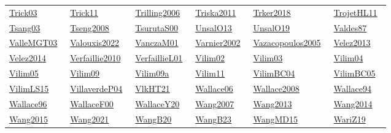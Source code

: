 \begin{longtable}{*{6}{l}}
\href{../works/Trick03.pdf}{Trick03}~\cite{Trick03} & \href{../}{Trick11}~\cite{Trick11} & \href{../}{Trilling2006}~\cite{Trilling2006} & \href{../}{Triska2011}~\cite{Triska2011} & \href{../}{Trker2018}~\cite{Trker2018} & \href{../works/TrojetHL11.pdf}{TrojetHL11}~\cite{TrojetHL11}\\ 
\href{../works/Tsang03.pdf}{Tsang03}~\cite{Tsang03} & \href{../}{Tseng2008}~\cite{Tseng2008} & \href{../}{TsurutaS00}~\cite{TsurutaS00} & \href{../works/UnsalO13.pdf}{UnsalO13}~\cite{UnsalO13} & \href{../works/UnsalO19.pdf}{UnsalO19}~\cite{UnsalO19} & \href{../works/Valdes87.pdf}{Valdes87}~\cite{Valdes87}\\ 
\href{../works/ValleMGT03.pdf}{ValleMGT03}~\cite{ValleMGT03} & \href{../}{Valouxis2022}~\cite{Valouxis2022} & \href{../works/VanczaM01.pdf}{VanczaM01}~\cite{VanczaM01} & \href{../}{Varnier2002}~\cite{Varnier2002} & \href{../}{Vazacopoulos2005}~\cite{Vazacopoulos2005} & \href{../}{Velez2013}~\cite{Velez2013}\\ 
\href{../}{Velez2014}~\cite{Velez2014} & \href{../}{Verfaillie2010}~\cite{Verfaillie2010} & \href{../works/VerfaillieL01.pdf}{VerfaillieL01}~\cite{VerfaillieL01} & \href{../works/Vilim02.pdf}{Vilim02}~\cite{Vilim02} & \href{../works/Vilim03.pdf}{Vilim03}~\cite{Vilim03} & \href{../works/Vilim04.pdf}{Vilim04}~\cite{Vilim04}\\ 
\href{../works/Vilim05.pdf}{Vilim05}~\cite{Vilim05} & \href{../works/Vilim09.pdf}{Vilim09}~\cite{Vilim09} & \href{../works/Vilim09a.pdf}{Vilim09a}~\cite{Vilim09a} & \href{../works/Vilim11.pdf}{Vilim11}~\cite{Vilim11} & \href{../works/VilimBC04.pdf}{VilimBC04}~\cite{VilimBC04} & \href{../works/VilimBC05.pdf}{VilimBC05}~\cite{VilimBC05}\\ 
\href{../works/VilimLS15.pdf}{VilimLS15}~\cite{VilimLS15} & \href{../}{VillaverdeP04}~\cite{VillaverdeP04} & \href{../works/VlkHT21.pdf}{VlkHT21}~\cite{VlkHT21} & \href{../works/Wallace06.pdf}{Wallace06}~\cite{Wallace06} & \href{../}{Wallace2008}~\cite{Wallace2008} & \href{../}{Wallace94}~\cite{Wallace94}\\ 
\href{../works/Wallace96.pdf}{Wallace96}~\cite{Wallace96} & \href{../works/WallaceF00.pdf}{WallaceF00}~\cite{WallaceF00} & \href{../works/WallaceY20.pdf}{WallaceY20}~\cite{WallaceY20} & \href{../}{Wang2007}~\cite{Wang2007} & \href{../}{Wang2013}~\cite{Wang2013} & \href{../}{Wang2014}~\cite{Wang2014}\\ 
\href{../}{Wang2015}~\cite{Wang2015} & \href{../}{Wang2021}~\cite{Wang2021} & \href{../works/WangB20.pdf}{WangB20}~\cite{WangB20} & \href{../works/WangB23.pdf}{WangB23}~\cite{WangB23} & \href{../works/WangMD15.pdf}{WangMD15}~\cite{WangMD15} & \href{../}{WariZ19}~\cite{WariZ19}\\ 

\end{longtable}
